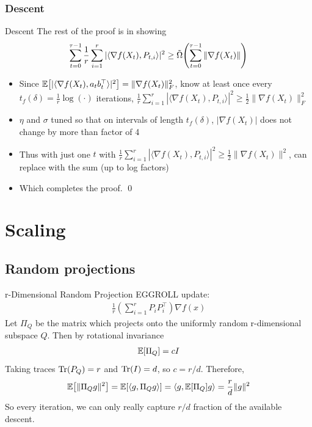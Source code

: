 \documentclass[10pt]{beamer}
\newcommand{\mg}[1]{\| #1 \|}
\newcommand{\E}{\mathbb{E}\qty}
\renewcommand{\grad}{\nabla}
\newcommand{\1}{\mathbbm{1}}
\begin{document}
\subsubsection{Descent}
\begin{frame}{Descent}
    The rest of the proof is in showing 
        \begin{align*}
        \sum_{t=0}^{\tau-1} \frac 1r \sum_{i=1}^r |\langle \grad f(X_t), P_{t,i} \rangle|^2 \geq \tilde \Omega \qty(\sum_{t=0}^{\tau-1} \mg{\grad f(X_t)})
    \end{align*}

\begin{itemize}
    \item Since $\E[|\langle \grad f(X_t), a_tb_t^\top \rangle |^2] = \| \grad f(X_t)\|_F^2$, know at least once every $t_f(\delta) = \frac{1}{r} \log(\cdot)$ iterations, $\frac 1r \sum_{i=1}^r |\langle \grad f(X_t), P_{t,i} \rangle|^2 \geq \frac 12 \mg{\grad f(X_t)}_F^2$
    \item $\eta$ and $\sigma$ tuned so that on intervals of length $t_f(\delta)$, $|\grad f(X_t)|$ does not change by more than factor of 4
    \item Thus with just one $t$ with $\frac 1r \sum_{i=1}^r |\langle \grad f(X_t), P_{t,i} \rangle|^2 \geq \frac 12 \mg{\grad f(X_t)}^2$, can replace with the sum (up to log factors)
    \item Which completes the proof. \qed
\end{itemize}
\end{frame}

\section{Scaling}
\subsection{Random projections}
\begin{frame}{r-Dimensional Random Projection}
    EGGROLL update:
    \begin{align*}
        \frac 1r \left(\sum_{i=1}^r P_iP_i^\top \right) \grad f(x)
    \end{align*}
    Let $\Pi_Q$ be the matrix which projects onto the uniformly random r-dimensional subspace $Q$. Then by rotational invariance
    \begin{align*}
        \E[\Pi_Q] = cI
    \end{align*}
    Taking traces $\Tr(P_Q) = r$ and $\Tr(I) = d$, so $c = r/d$. Therefore,
    \begin{align*}
        \E[\|\Pi_Q g \|^2] = \E[\langle g, \Pi_Q g \rangle] = \langle g, \E[\Pi_Q] g \rangle = \frac{r}{d} \mg{g}^2
    \end{align*}
    So every iteration, we can only really capture $r/d$ fraction of the available descent.
\end{frame}
\end{document}
